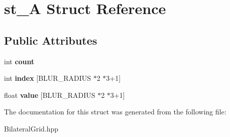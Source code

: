 \hypertarget{structst__A}{}\section{st\+\_\+A Struct Reference}
\label{structst__A}
\subsection*{Public Attributes}
\begin{DoxyCompactItemize}
\item 
int {\bfseries count}\hypertarget{structst__A_ae156e5d6273ec1b806152e64d107abef}{}\label{structst__A_ae156e5d6273ec1b806152e64d107abef}

\item 
int {\bfseries index} \mbox{[}B\+L\+U\+R\+\_\+\+R\+A\+D\+I\+US $\ast$2 $\ast$3+1\mbox{]}\hypertarget{structst__A_afb844ea6323f2a3796791e4d034bcfb5}{}\label{structst__A_afb844ea6323f2a3796791e4d034bcfb5}

\item 
float {\bfseries value} \mbox{[}B\+L\+U\+R\+\_\+\+R\+A\+D\+I\+US $\ast$2 $\ast$3+1\mbox{]}\hypertarget{structst__A_ad3501582749f4165303b8cae636cbc03}{}\label{structst__A_ad3501582749f4165303b8cae636cbc03}

\end{DoxyCompactItemize}


The documentation for this struct was generated from the following file\+:\begin{DoxyCompactItemize}
\item 
Bilateral\+Grid.\+hpp\end{DoxyCompactItemize}
